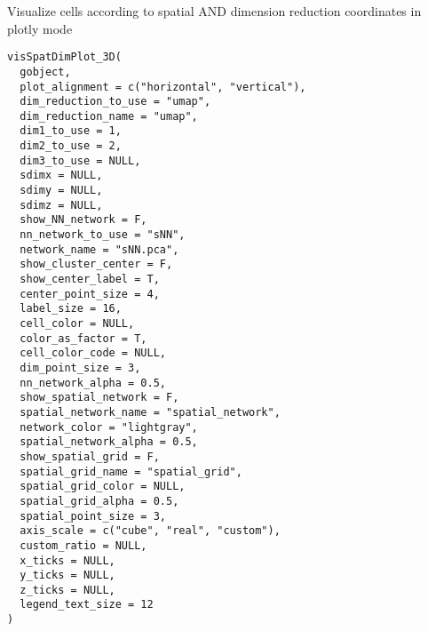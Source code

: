 \documentclass[a4paper]{book}
\begin{document}
%
\begin{Description}\relax
Visualize cells according to spatial AND dimension reduction coordinates in plotly mode
\end{Description}
%
\begin{Usage}
\begin{verbatim}
visSpatDimPlot_3D(
  gobject,
  plot_alignment = c("horizontal", "vertical"),
  dim_reduction_to_use = "umap",
  dim_reduction_name = "umap",
  dim1_to_use = 1,
  dim2_to_use = 2,
  dim3_to_use = NULL,
  sdimx = NULL,
  sdimy = NULL,
  sdimz = NULL,
  show_NN_network = F,
  nn_network_to_use = "sNN",
  network_name = "sNN.pca",
  show_cluster_center = F,
  show_center_label = T,
  center_point_size = 4,
  label_size = 16,
  cell_color = NULL,
  color_as_factor = T,
  cell_color_code = NULL,
  dim_point_size = 3,
  nn_network_alpha = 0.5,
  show_spatial_network = F,
  spatial_network_name = "spatial_network",
  network_color = "lightgray",
  spatial_network_alpha = 0.5,
  show_spatial_grid = F,
  spatial_grid_name = "spatial_grid",
  spatial_grid_color = NULL,
  spatial_grid_alpha = 0.5,
  spatial_point_size = 3,
  axis_scale = c("cube", "real", "custom"),
  custom_ratio = NULL,
  x_ticks = NULL,
  y_ticks = NULL,
  z_ticks = NULL,
  legend_text_size = 12
)
\end{verbatim}
\end{Usage}
%
\end{document}
